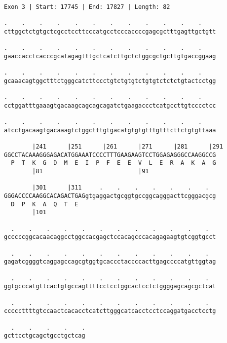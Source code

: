 \documentclass{article}
\begin{document}
\newpage
\begin{Verbatim}
Exon 3 | Start: 17745 | End: 17827 | Length: 82
 
.    .    .    .    .    .    .    .    .    .    .    .    
cttggctctgtgctcgcctccttcccatgcctcccaccccgagcgctttgagttgctgtt
  
.    .    .    .    .    .    .    .    .    .    .    .    
gaaccacctcacccgcatagagtttgctcatcttgctctggcgctgcttgtgaccggaag
  
.    .    .    .    .    .    .    .    .    .    .    .    
gcaaacagtggctttctgggcatcttccctgtctgtgtctgtgtctctctgtactcctgg
  
.    .    .    .    .    .    .    .    .    .    .    .    
cctggatttgaaagtgacaagcagcagcagatctgaagaccctcatgccttgtcccctcc
  
.    .    .    .    .    .    .    .    .    .    .    .    
atcctgacaagtgacaaagtctggctttgtgacatgtgtgtttgtttcttctgtgttaaa
  
        |241      |251      |261      |271      |281      |291
GGCCTACAAAGGGAGACATGGAAATCCCCTTTGAAGAAGTCCTGGAGAGGGCCAAGGCCG
  P  T  K  G  D  M  E  I  P  F  E  E  V  L  E  R  A  K  A  G
        |81                           |91                   
  
        |301      |311     .    .    .    .    .    .    .  
GGGACCCCAAGGCACAGACTGAGgtgaggactgcggtgccggcagggacttcgggacgcg
  D  P  K  A  Q  T  E                                       
        |101                                                
  
  .    .    .    .    .    .    .    .    .    .    .    .  
gcccccggcacaacaggcctggccacgagctccacagcccacagagaagtgtcggtgcct
  
  .    .    .    .    .    .    .    .    .    .    .    .  
gagatcggggtcaggagccagcgtggtgcaccctaccccacttgagccccatgttggtag
  
  .    .    .    .    .    .    .    .    .    .    .    .  
ggtgcccatgttcactgtgccagttttcctcctggcactcctctggggagcagcgctcat
  
  .    .    .    .    .    .    .    .    .    .    .    .  
cccccttttgtccaactcacacctcatcttgggcatcacctcctccaggatgacctcctg
  
  .    .    .    .    .
gcttcctgcagctgcctgctcag
\end{Verbatim}
\newpage
\end{document}
